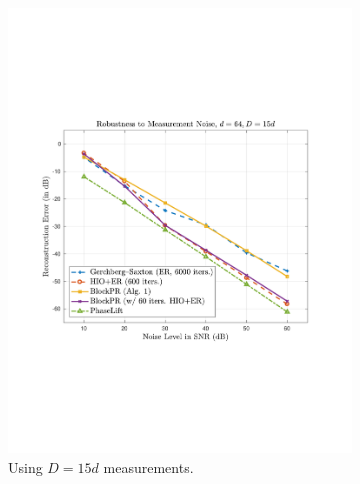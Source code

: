 \begin{figure}[hbtp]
\begin{subfigure}[b]{0.480\textwidth}
\includegraphics[clip=true, trim = 0.75in 2.75in 1in 2.5in,scale=0.45]{pics/robustness_600b}
\caption{Using $D=15d$ measurements.}
\label{fig:noise-15d}
\end{subfigure}\vspace{0.1in} \\
\begin{subfigure}[b]{0.510\textwidth}
\centering

\end{subfigure}
\end{figure}
